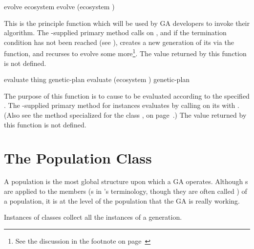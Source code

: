 \filbreak

{\samepage
\Defgeneric evolve {ecosystem}
 evolve {(ecosystem )}

This is the principle function which will be used by GA developers to invoke
their algorithm. The \geco-supplied primary method calls  on
, and if the termination condition has not been
reached (see ), creates a new generation of
its  via the  function, and
recurses to evolve some more\footnote{See the discussion in the footnote on
page~\pageref{recursive-vs-iterative-evolve}}.
The value returned by this function is not defined.
\par}%

\filbreak

{\samepage  
\Defgeneric evaluate {thing genetic-plan}
 evaluate {(ecosystem ) genetic-plan}

The purpose of this function is to cause  to be evaluated according to
the specified . The \geco-supplied primary method for
 instances evaluates  by calling
 on its  with . (Also
see the  method specialized for the class , on
page~\pageref{evaluate-population}.)
The value returned by this function is not defined.
\par}%

\filbreak


\section{The Population Class} \label{sec:population}

A population is the most global structure upon which a GA operates. Although
s are applied to the members (s in 
\geco's terminology, though they are often called
) of a population, it is at the level of the population that
the GA is really working.

\filbreak

{\samepage
{}

Instances of  classes collect all the  
instances of a generation.
\par}%

